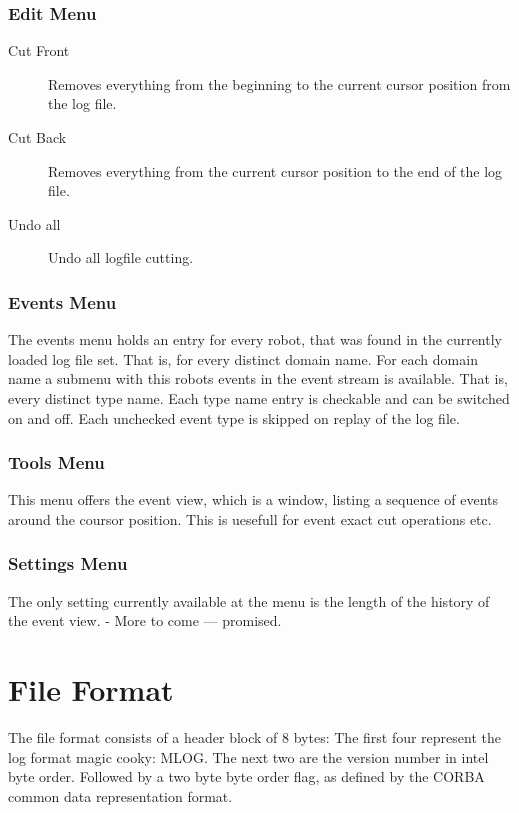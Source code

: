 \subsubsection{Edit Menu}
\begin{description}
\item[Cut Front] Removes everything from the beginning to the current
  cursor position from the log file.
\item[Cut Back] Removes everything from the current cursor position to
  the end of the log file.
\item[Undo all] Undo all logfile cutting.
\end{description}

\subsubsection{Events Menu}
The events menu holds an entry for every robot, that was found in the
currently loaded log file set. That is, for every distinct domain
name. For each domain name a submenu with this robots events in the event
stream is available. That is, every distinct type name. Each type name
entry is checkable and can be switched on and off. Each unchecked
event type is skipped on replay of the log file.

\subsubsection{Tools Menu}
This menu offers the event view, which is a window, listing a sequence
of events around the coursor position. This is uesefull for event
exact cut operations etc.

\subsubsection{Settings Menu}
The only setting currently available at the menu is the length of the
history of the event view. - More to come --- promised.


\section{File Format}

The file format consists of a header block of 8 bytes: The first four
represent the log format magic cooky: MLOG. The next two are the
version number in intel byte order. Followed by a two byte byte
order flag, as defined by the CORBA common data representation format.

